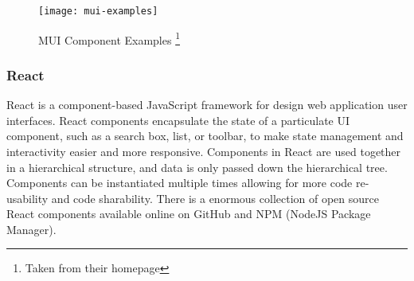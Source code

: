 \begin{figure}
  \centering
  \texttt{[image: mui-examples]}
  \caption{MUI Component Examples \footnote{Taken from their homepage}}
  \label{fig:mui-example-components} 
\end{figure}

\subsubsection{React}
React is a component-based JavaScript framework for design web application user interfaces. React
components encapsulate the state of a particulate UI component, such as a search box, list, or
toolbar, to make state management and interactivity easier and more responsive. Components in React
are used together in a hierarchical structure, and data is only passed down the hierarchical tree.
Components can be instantiated multiple times allowing for more code re-usability and code
sharability. There is a enormous collection of open source React components available online on
GitHub and NPM (NodeJS Package Manager).
